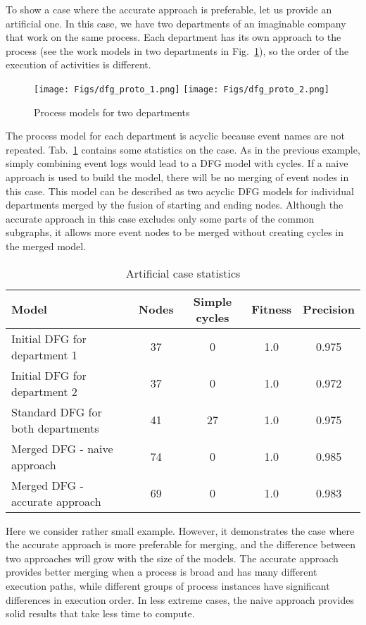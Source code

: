 \documentclass[11pt]{article}
\theoremstyle{definition}
\begin{document}
To show a case where the accurate approach is preferable, let us provide an artificial one. In this case, we have two departments of an imaginable company that work on the same process. Each department has its own approach to the process (see the work models in two departments in Fig.~\ref{fig:two_dep}), so the order of the execution of activities is different.

\begin{figure}[htb]
    \centering
    \texttt{[image: Figs/dfg\_proto\_1.png]}
    \texttt{[image: Figs/dfg\_proto\_2.png]}
    \caption{Process models for two departments}
    \label{fig:two_dep}
\end{figure}

The process model for each department is acyclic because event names are not repeated. Tab.~\ref{tbl:gen_models_stats} contains some statistics on the case. 
As in the previous example, simply combining event logs would lead to a DFG model with cycles. If a naive approach is used to build the model, there will be no merging of event nodes in this case. This model can be described as two acyclic DFG models for individual departments merged by the fusion of starting and ending nodes. 
Although the accurate approach in this case excludes only some parts of the common subgraphs, it allows more event nodes to be merged without creating cycles in the merged model.

\begin{table}[htb]
    \centering
    \caption{Artificial case statistics}
    \begin{tabular}{l c c c c}
    \textbf{Model} & \textbf{Nodes} & \textbf{Simple cycles} & \textbf{Fitness} & \textbf{Precision}  \\
    \hline\hline 
    Initial DFG for department 1 & 37 & 0 & 1.0 & 0.975 \\
    \hline
    Initial DFG for department 2 & 37 & 0 & 1.0 & 0.972 \\
    \hline\hline 
    Standard DFG for both departments & 41 & 27 & 1.0 & 0.975 \\
    \hline
    Merged DFG - naive approach & 74 & 0 & 1.0 & 0.985  \\
    \hline
    Merged DFG - accurate approach & 69 & 0 & 1.0 & 0.983 \\
    \hline\hline
    \end{tabular}
  \label{tbl:gen_models_stats}
\end{table}

Here we consider rather small example. However, it demonstrates the case where the accurate approach is more preferable for merging, and the difference between two approaches will grow with the size of the models. The accurate approach provides better merging when a process is broad and has many different execution paths, while different groups of process instances have significant differences in execution order. In less extreme cases, the naive approach provides solid results that take less time to compute.
\end{document}
